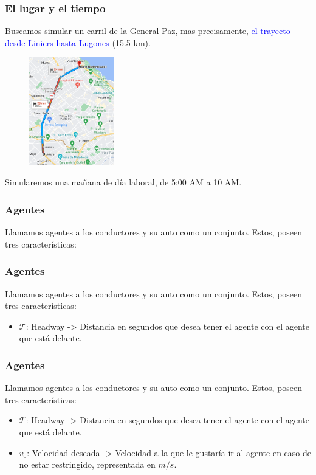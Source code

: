 \documentclass[10pt, compress]{beamer}
\begin{document}
\begin{frame}[fragile]

\frametitle{El lugar y el tiempo}
Buscamos simular un carril de la General Paz, mas precisamente, \href{https://www.google.com.ar/maps/dir/-34.6549026,-58.5273448/RN+A001,+Buenos+Aires/@-34.5529941,-58.5215513,13z/data=!4m9!4m8!1m0!1m5!1m1!1s0x95bcb6a69ad1fc61:0x7f1d6a8008451498!2m2!1d-58.4682776!2d-34.5357282!3e0?entry=ttu}{\textcolor{blue}{el trayecto desde Liniers hasta Lugones}} (15.5 km). 

\begin{figure}
\centering
\includegraphics[width=10em]{gmaps-recorrido}
\end{figure}

Simularemos una ma\~nana de d\'ia laboral, de 5:00 AM a 10 AM.

\end{frame}

\begin{frame}[fragile]

\frametitle{Agentes}

Llamamos agentes a los conductores y su auto como un conjunto. Estos, poseen tres caracter\'isticas:

\end{frame}

\begin{frame}[fragile]

\frametitle{Agentes}

Llamamos agentes a los conductores y su auto como un conjunto. Estos, poseen tres caracter\'isticas:

\begin{itemize}
\item $\mathcal{T}$: Headway -> Distancia en segundos que desea tener el agente con el agente que est\'a delante.
\end{itemize}

\end{frame}
\begin{frame}[fragile]

\frametitle{Agentes}

Llamamos agentes a los conductores y su auto como un conjunto. Estos, poseen tres caracter\'isticas:

\begin{itemize}
\item $\mathcal{T}$: Headway -> Distancia en segundos que desea tener el agente con el agente que est\'a delante.
\item $v_0$: Velocidad deseada -> Velocidad a la que le gustar\'ia ir al agente en caso de no estar restringido, representada en $m/s$.
\end{itemize}

\end{frame}
\end{document}
